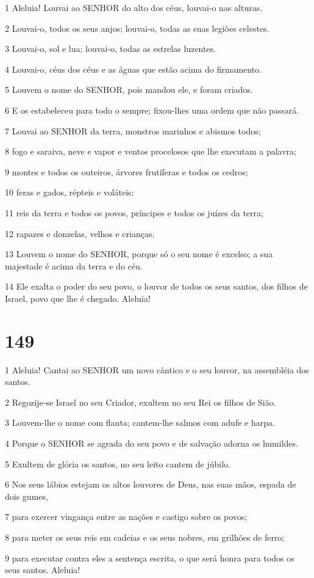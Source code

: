 \par 1 Aleluia! Louvai ao SENHOR do alto dos céus, louvai-o nas alturas.
\par 2 Louvai-o, todos os seus anjos; louvai-o, todas as suas legiões celestes.
\par 3 Louvai-o, sol e lua; louvai-o, todas as estrelas luzentes.
\par 4 Louvai-o, céus dos céus e as águas que estão acima do firmamento.
\par 5 Louvem o nome do SENHOR, pois mandou ele, e foram criados.
\par 6 E os estabeleceu para todo o sempre; fixou-lhes uma ordem que não passará.
\par 7 Louvai ao SENHOR da terra, monstros marinhos e abismos todos;
\par 8 fogo e saraiva, neve e vapor e ventos procelosos que lhe executam a palavra;
\par 9 montes e todos os outeiros, árvores frutíferas e todos os cedros;
\par 10 feras e gados, répteis e voláteis;
\par 11 reis da terra e todos os povos, príncipes e todos os juízes da terra;
\par 12 rapazes e donzelas, velhos e crianças.
\par 13 Louvem o nome do SENHOR, porque só o seu nome é excelso; a sua majestade é acima da terra e do céu.
\par 14 Ele exalta o poder do seu povo, o louvor de todos os seus santos, dos filhos de Israel, povo que lhe é chegado. Aleluia!

\chapter{149}

\par 1 Aleluia! Cantai ao SENHOR um novo cântico e o seu louvor, na assembléia dos santos.
\par 2 Regozije-se Israel no seu Criador, exultem no seu Rei os filhos de Sião.
\par 3 Louvem-lhe o nome com flauta; cantem-lhe salmos com adufe e harpa.
\par 4 Porque o SENHOR se agrada do seu povo e de salvação adorna os humildes.
\par 5 Exultem de glória os santos, no seu leito cantem de júbilo.
\par 6 Nos seus lábios estejam os altos louvores de Deus, nas suas mãos, espada de dois gumes,
\par 7 para exercer vingança entre as nações e castigo sobre os povos;
\par 8 para meter os seus reis em cadeias e os seus nobres, em grilhões de ferro;
\par 9 para executar contra eles a sentença escrita, o que será honra para todos os seus santos. Aleluia!

